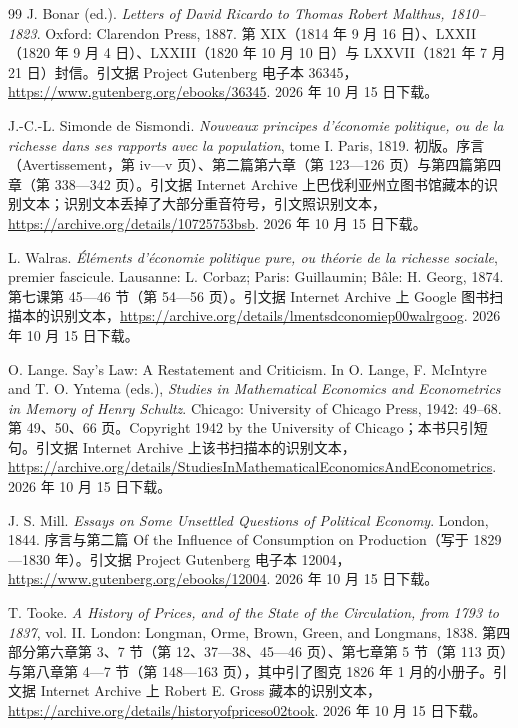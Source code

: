 \begin{thebibliography}{99}
 J. Bonar (ed.). \emph{Letters of David Ricardo to Thomas Robert Malthus, 1810--1823}. Oxford: Clarendon Press, 1887. 第 XIX（1814 年 9 月 16 日）、LXXII（1820 年 9 月 4 日）、LXXIII（1820 年 10 月 10 日）与 LXXVII（1821 年 7 月 21 日）封信。引文据 Project Gutenberg 电子本 36345，\url{https://www.gutenberg.org/ebooks/36345}. 2026 年 10 月 15 日下载。

 J.-C.-L. Simonde de Sismondi. \emph{Nouveaux principes d'économie politique, ou de la richesse dans ses rapports avec la population}, tome I. Paris, 1819. 初版。序言（Avertissement，第 iv—v 页）、第二篇第六章（第 123—126 页）与第四篇第四章（第 338—342 页）。引文据 Internet Archive 上巴伐利亚州立图书馆藏本的识别文本；识别文本丢掉了大部分重音符号，引文照识别文本，\url{https://archive.org/details/10725753bsb}. 2026 年 10 月 15 日下载。

 L. Walras. \emph{Éléments d'économie politique pure, ou théorie de la richesse sociale}, premier fascicule. Lausanne: L. Corbaz; Paris: Guillaumin; Bâle: H. Georg, 1874. 第七课第 45—46 节（第 54—56 页）。引文据 Internet Archive 上 Google 图书扫描本的识别文本，\url{https://archive.org/details/lmentsdconomiep00walrgoog}. 2026 年 10 月 15 日下载。

 O. Lange. Say's Law: A Restatement and Criticism. In O. Lange, F. McIntyre and T. O. Yntema (eds.), \emph{Studies in Mathematical Economics and Econometrics in Memory of Henry Schultz}. Chicago: University of Chicago Press, 1942: 49--68. 第 49、50、66 页。Copyright 1942 by the University of Chicago；本书只引短句。引文据 Internet Archive 上该书扫描本的识别文本，\url{https://archive.org/details/StudiesInMathematicalEconomicsAndEconometrics}. 2026 年 10 月 15 日下载。

 J. S. Mill. \emph{Essays on Some Unsettled Questions of Political Economy}. London, 1844. 序言与第二篇 Of the Influence of Consumption on Production（写于 1829—1830 年）。引文据 Project Gutenberg 电子本 12004，\url{https://www.gutenberg.org/ebooks/12004}. 2026 年 10 月 15 日下载。

 T. Tooke. \emph{A History of Prices, and of the State of the Circulation, from 1793 to 1837}, vol. II. London: Longman, Orme, Brown, Green, and Longmans, 1838. 第四部分第六章第 3、7 节（第 12、37—38、45—46 页）、第七章第 5 节（第 113 页）与第八章第 4—7 节（第 148—163 页），其中引了图克 1826 年 1 月的小册子。引文据 Internet Archive 上 Robert E. Gross 藏本的识别文本，\url{https://archive.org/details/historyofpriceso02took}. 2026 年 10 月 15 日下载。


\end{thebibliography}
